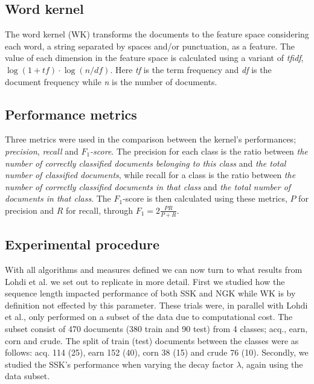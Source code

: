 
\subsection{Word kernel}
The word kernel (WK) transforms the documents to the feature space considering each word, a string separated by spaces and/or punctuation, as a feature. The value of each dimension in the feature space is calculated using a variant of \textit{tfidf}, $ \log(1+tf) \cdot \log(n/df) $. Here \textit{tf} is the term frequency and \textit{df} is the document frequency while \textit{n} is the number of documents. 


\subsection{Performance metrics}
Three metrics were used in the comparison between the kernel's performances; \textit{precision}, \textit{recall} and \textit{$ F_1 $-score}. The precision for each class is the ratio between \textit{the number of correctly classified documents belonging to this class} and \textit{the total number of classified documents}, while recall for a class is the ratio between \textit{the number of correctly classified documents in that class} and \textit{the total number of documents in that class}. The $ F_1 $-score is then calculated using these metrics, $ P $ for precision and $ R $ for recall, through $F_1 = 2\frac{PR}{P+R}$.


\subsection{Experimental procedure}
With all algorithms and measures defined we can now turn to what results from Lohdi et al. we set out to replicate in more detail. First we studied how the sequence length impacted performance of both SSK and NGK while WK is by definition not effected by this parameter. These trials were, in parallel with Lohdi et al., only performed on a subset of the data due to computational cost. The subset consist of 470 documents (380 train and 90 test) from  4 classes; acq., earn, corn and crude. The split of train (test) documents between the classes were as follows: acq. 114 (25), earn 152 (40), corn 38 (15) and crude 76 (10). Secondly, we studied the SSK's performance when varying the decay factor $ \lambda $, again using the data subset. %

